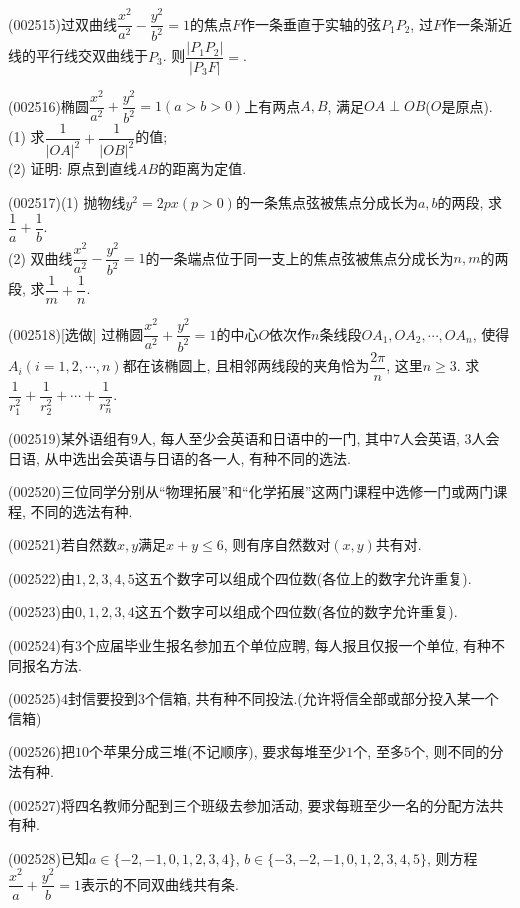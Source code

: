 \item (002515)过双曲线$\dfrac{x^2}{a^2}-\dfrac{y^2}{b^2}=1$的焦点$F$作一条垂直于实轴的弦$P_1P_2$, 过$F$作一条渐近线的平行线交双曲线于$P_3$. 则$\dfrac{|P_1P_2|}{|P_3F|}=$.
\item (002516)椭圆$\dfrac{x^2}{a^2}+\dfrac{y^2}{b^2}=1(a>b>0)$上有两点$A,B$, 满足$OA\perp OB$($O$是原点).\\ 
(1) 求$\dfrac{1}{|OA|^2}+\dfrac{1}{|OB|^2}$的值;\\ 
(2) 证明: 原点到直线$AB$的距离为定值.
\item (002517)(1) 抛物线$y^2=2px(p>0)$的一条焦点弦被焦点分成长为$a,b$的两段, 求$\dfrac{1}{a}+\dfrac{1}{b}$.\\ 
(2) 双曲线$\dfrac{x^2}{a^2}-\dfrac{y^2}{b^2}=1$的一条端点位于同一支上的焦点弦被焦点分成长为$n,m$的两段, 求$\dfrac{1}{m}+\dfrac{1}{n}$.
\item (002518)[选做]
过椭圆$\dfrac{x^2}{a^2}+\dfrac{y^2}{b^2}=1$的中心$O$依次作$n$条线段$OA_1,OA_2,\cdots,OA_n$, 使得$A_i(i=1,2,\cdots,n)$都在该椭圆上, 且相邻两线段的夹角恰为$\dfrac{2\pi}{n}$, 这里$n\ge 3$. 求$\dfrac{1}{r_1^2}+\dfrac{1}{r_2^2}+\cdots+\dfrac{1}{r_n^2}$.
\item (002519)某外语组有$9$人, 每人至少会英语和日语中的一门, 其中$7$人会英语, $3$人会日语, 从中选出会英语与日语的各一人, 有种不同的选法.
\item (002520)三位同学分别从``物理拓展''和``化学拓展''这两门课程中选修一门或两门课程, 不同的选法有种.
\item (002521)若自然数$x,y$满足$x+y\le 6$, 则有序自然数对$(x,y)$共有对.
\item (002522)由$1,2,3,4,5$这五个数字可以组成个四位数(各位上的数字允许重复).
\item (002523)由$0,1,2,3,4$这五个数字可以组成个四位数(各位的数字允许重复).
\item (002524)有$3$个应届毕业生报名参加五个单位应聘, 每人报且仅报一个单位, 有种不同报名方法.
\item (002525)$4$封信要投到$3$个信箱, 共有种不同投法.(允许将信全部或部分投入某一个信箱)
\item (002526)把$10$个苹果分成三堆(不记顺序), 要求每堆至少$1$个, 至多$5$个, 则不同的分法有种.
\item (002527)将四名教师分配到三个班级去参加活动, 要求每班至少一名的分配方法共有种.
\item (002528)已知$a\in\{-2,-1,0,1,2,3,4\}$, $b\in \{-3,-2,-1,0,1,2,3,4,5\}$, 则方程$\dfrac{x^2}{a}+\dfrac{y^2}{b}=1$表示的不同双曲线共有条.
